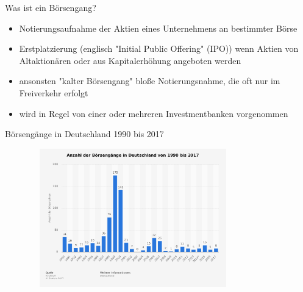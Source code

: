 \documentclass{beamer}
\begin{document}
\begin{frame} {Was ist ein Börsengang?}
\begin{itemize}
\item Notierungsaufnahme der Aktien eines Unternehmens an bestimmter Börse 
\item Erstplatzierung (englisch "Initial Public Offering" (IPO)) wenn Aktien von Altaktionären oder aus Kapitalerhöhung angeboten werden
\item ansonsten "kalter Börsengang" bloße Notierungsnahme, die oft nur im Freiverkehr erfolgt
\item wird in Regel von einer oder mehreren Investmentbanken vorgenommen
\end{itemize}
\end{frame}


\begin{frame} {Börsengänge in Deutschland 1990 bis 2017}
\begin{figure}
	\centering
	\includegraphics[width=9cm, height=6cm]{anzboersengaenge.PNG}
\end{figure}
\end{frame}
\end{document}
